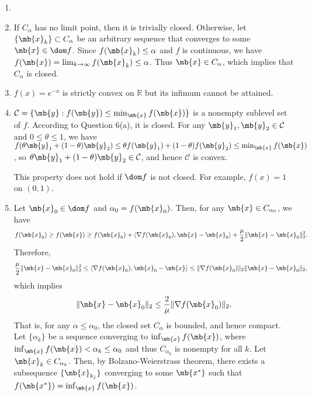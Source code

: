 \begin{exercise}
\begin{enumerate}
      \begin{solution}
        \begin{enumerate}
          \item []
          \item If $C_\alpha$ has no limit point, then it is trivially closed. Otherwise, let $\{\mb{x}_k\}\subset C_\alpha$ be an arbitrary sequence that converges to some $\mb{x}\in \dom f$. Since $f(\mb{x}_k)\le \alpha$ and $f$ is continuous, we have $f(\mb{x}) = \lim_{k\to\infty}f(\mb{x}_k)\le \alpha$. Thus $\mb{x}\in C_\alpha$, which implies that $C_\alpha$ is closed.
          \item $f(x) = e^{-x}$ is strictly convex on $\mathbb{R}$ but its infimum cannot be attained.
          \item $\mathcal{C}=\{ \mb{y}:f(\mb{y})\le\min_{\mb{x}} f(\mb{x})\}$ is a nonempty sublevel set of $f$. According to Question 6(a), it is closed. For any $\mb{y}_1, \mb{y}_2\in \mathcal{C}$ and $0 \le \theta \le 1$, we have $f(\theta\mb{y}_1+(1-\theta)\mb{y}_2)\leq \theta f(\mb{y}_1)+(1-\theta)f(\mb{y}_2)\leq \min_{\mb{x}} f(\mb{x})$, so $\theta\mb{y}_1+(1-\theta)\mb{y}_2\in \mathcal{C}$, and hence $\mathcal{C}$ is convex.
            
            This property does not hold if $\dom f$ is not closed. For example, $f(x) = 1$ on $(0,1)$.
          \item Let $\mb{x}_0\in \dom f$ and $\alpha_0 = f(\mb{x}_0)$. Then, for any $\mb{x}\in C_{\alpha_0}$, we have
            $$
              f(\mb{x}_0) \ge f(\mb{x})\ge f(\mb{x}_0)+\langle\nabla f(\mb{x}_0),\mb{x}-\mb{x}_0\rangle+\frac{\mu}{2}\|\mb{x}-\mb{x}_0\|_2^2.
            $$
            Therefore,
            $$
              \frac{\mu}{2}\|\mb{x}-\mb{x}_0\|_2^2 \le \langle\nabla f(\mb{x}_0),\mb{x}_0-\mb{x}\rangle \le \|\nabla f(\mb{x}_0)\|_2\|\mb{x}-\mb{x}_0\|_2,
            $$
            which implies
            $$
              \|\mb{x}-\mb{x}_0\|_2 \le \frac{2}{\mu}\|\nabla f(\mb{x}_0)\|_2.
            $$
            That is, for any $\alpha \le \alpha_0$, the closed set $C_{\alpha}$ is bounded, and hence compact. Let $\{\alpha_k\}$ be a sequence converging to $\inf_{\mb{x}} f(\mb{x})$, where $\inf_{\mb{x}} f(\mb{x}) < \alpha_k \le \alpha_0$ and thus $C_{\alpha_k}$ is nonempty for all $k$. Let $\mb{x}_k\in C_{\alpha_k}$. Then, by Bolzano-Weierstrass theorem, there exists a subsequence $\{\mb{x}_{k_j}\}$ converging to some $\mb{x^*}$ such that $f(\mb{x^*}) = \inf_{\mb{x}} f(\mb{x})$.
            

\end{enumerate}
\end{solution}
\end{enumerate}
\end{exercise}
